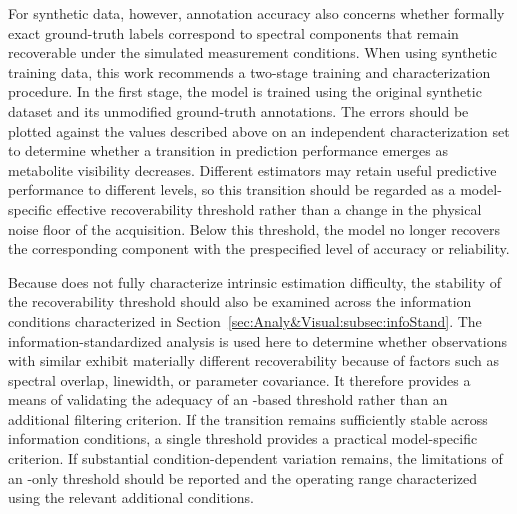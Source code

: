 For synthetic data, however, annotation accuracy also concerns whether formally exact ground-truth labels correspond to spectral components that remain recoverable under the simulated measurement conditions. When using synthetic training data, this work recommends a two-stage training and characterization procedure. In the first stage, the \DL model is trained using the original synthetic dataset and its unmodified ground-truth annotations. The errors should be plotted against the \mSNR values described above on an independent characterization set to determine whether a transition in prediction performance emerges as metabolite visibility decreases. Different estimators may retain useful predictive performance to different \mSNR levels, so this transition should be regarded as a model-specific effective recoverability threshold rather than a change in the physical noise floor of the acquisition. Below this threshold, the model no longer recovers the corresponding component with the prespecified level of accuracy or reliability.

Because \mSNR does not fully characterize intrinsic estimation difficulty, the stability of the recoverability threshold should also be examined across the information conditions characterized in Section~\ref{sec:Analy&Visual:subsec:infoStand}. The information-standardized analysis is used here to determine whether observations with similar \mSNR exhibit materially different recoverability because of factors such as spectral overlap, linewidth, or parameter covariance. It therefore provides a means of validating the adequacy of an \mSNR-based threshold rather than an additional filtering criterion. If the transition remains sufficiently stable across information conditions, a single \mSNR threshold provides a practical model-specific criterion. If substantial condition-dependent variation remains, the limitations of an \mSNR-only threshold should be reported and the operating range characterized using the relevant additional conditions.

